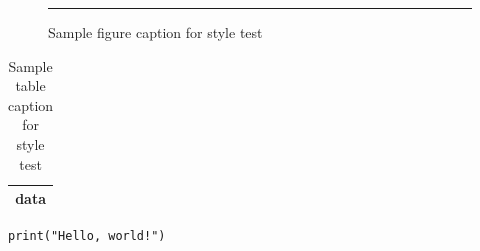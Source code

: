 \documentclass{ui1activity}
\begin{document}
\makeatletter
{}

\begin{figure}[h]
  \centering
  \rule{2cm}{1cm}
  \caption{Sample figure caption for style test}
\end{figure}

\begin{table}[h]
  \centering
  \begin{tabular}{|c|}
    \hline data \\ \hline
  \end{tabular}
  \caption{Sample table caption for style test}
\end{table}

\begin{lstlisting}[caption={Sample code caption for style test}, float=h]
print("Hello, world!")
\end{lstlisting}

\makeatother
\end{document}
